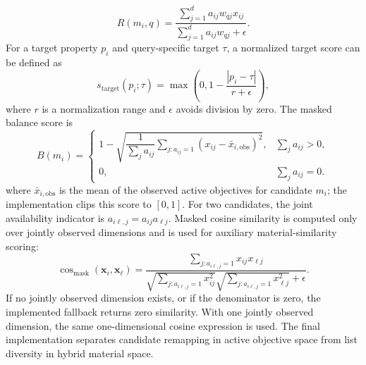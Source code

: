 \documentclass[12pt,a4paper]{article}
\begin{document}
\begin{equation}
  R(m_i, q) =
  \frac{\sum_{j=1}^{d} a_{ij}w_{qj}x_{ij}}
       {\sum_{j=1}^{d} a_{ij}w_{qj}+\epsilon}.
  \label{eq:relevance}
\end{equation}
For a target property $p_i$ and query-specific target $\tau$, a normalized target score can be defined as
\begin{equation}
  s_{\mathrm{target}}(p_i;\tau) = \max\!\left(0, 1 - \frac{|p_i - \tau|}{r + \epsilon}\right),
\end{equation}
where $r$ is a normalization range and $\epsilon$ avoids division by zero. The masked balance score is
\begin{equation}
  B(m_i) =
  \begin{cases}
  1-\sqrt{\dfrac{1}{\sum_j a_{ij}}\displaystyle\sum_{j:a_{ij}=1}\left(x_{ij}-\bar{x}_{i,\mathrm{obs}}\right)^2}, & \sum_j a_{ij} > 0,\\[8pt]
  0, & \sum_j a_{ij}=0.
  \end{cases}
\end{equation}
where $\bar{x}_{i,\mathrm{obs}}$ is the mean of the observed active objectives for candidate $m_i$; the implementation clips this score to $[0,1]$. For two candidates, the joint availability indicator is $a_{i\ell,j}=a_{ij}a_{\ell j}$. Masked cosine similarity is computed only over jointly observed dimensions and is used for auxiliary material-similarity scoring:
\begin{equation}
  \cos_{\mathrm{mask}}(\mathbf{x}_i,\mathbf{x}_\ell)=
  \frac{\sum_{j:a_{i\ell,j}=1}x_{ij}x_{\ell j}}
       {\sqrt{\sum_{j:a_{i\ell,j}=1}x_{ij}^2}\sqrt{\sum_{j:a_{i\ell,j}=1}x_{\ell j}^2}+\epsilon}.
\end{equation}
If no jointly observed dimension exists, or if the denominator is zero, the implemented fallback returns zero similarity. With one jointly observed dimension, the same one-dimensional cosine expression is used. The final implementation separates candidate remapping in active objective space from list diversity in hybrid material space.
\end{document}
